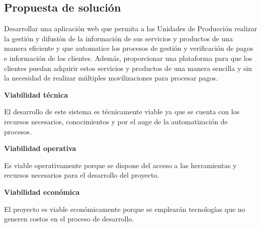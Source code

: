\subsection{Propuesta de solución}
Desarrollar una aplicación web que permita a las Unidades de Producción
realizar la gestión y difusión de la información de sus servicios y productos de una
manera eficiente y que automatice los procesos de gestión y verificación de
pagos e información de los clientes. Además, proporcionar una plataforma
para que los clientes puedan adquirir estos servicios y productos de una manera
sencilla y sin la necesidad de realizar múltiples movilizaciones para procesar
pagos.

\bigbreak
\textbf{Viabilidad técnica}\par
El desarrollo de este sistema es técnicamente viable ya que se cuenta con los
recursos necesarios, conocimientos y por el auge de la automatización de
procesos.

\bigbreak
\textbf{Viabilidad operativa}\par
Es viable operativamente porque se dispone del acceso a las herramientas y
recursos necesarios para el desarrollo del proyecto.

\bigbreak
\textbf{Viabilidad económica}\par
El proyecto es viable económicamente porque se emplearán tecnologías que no
generen costos en el proceso de desarrollo.
